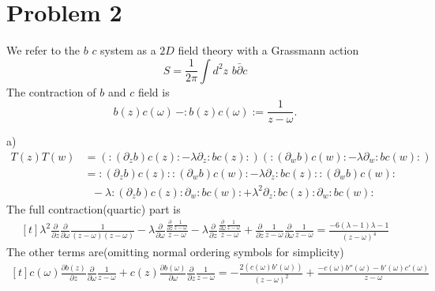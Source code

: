 \documentclass[12pt]{article}
\begin{document}
\section{Problem 2}
We refer to the $b$ $c$ system as a $2D$ field theory with a Grassmann action
\begin{equation}
S=\frac{1}{2\pi } \int d^2 z \,\,b  \bar{\partial} c
\end{equation}
The contraction of $b$ and $c$ field is 
\begin{equation}
b(z)c(\omega)\,-:b(z)c(\omega):=\frac{1}{z-\omega}.
\end{equation}
\begin{paragraph}{a)}
\begin{equation}
\begin{split}
T(z) T(w) & =\left(  : (\partial_z b) c(z): - \lambda \partial_z : b c (z): \right) \left(  : (\partial_w b) c(w): - \lambda \partial_w : b c (w): \right)  \\
& =  : (\partial_z b) c(z):  : (\partial_w b) c(w):  - \lambda \partial_z : b c (z):  : (\partial_w b) c(w):  \\
&~~~- \lambda  : (\partial_z b) c(z):\partial_w : b c (w):  + \lambda^2 \partial_z : b c (z):\partial_w : b c (w): 
\end{split}
\end{equation}
The full contraction(quartic) part is
\begin{equation}
\begin{aligned}[t]
\lambda ^2 \frac{\partial }{\partial z}\frac{\partial }{\partial \omega }\frac{1}{(z-\omega ) (z-\omega )}-\lambda  \frac{\partial }{\partial \omega }\frac{\frac{\partial }{\partial z}\frac{1}{z-\omega }}{z-\omega }-\lambda  \frac{\partial }{\partial z}\frac{\frac{\partial }{\partial \omega }\frac{1}{z-\omega }}{z-\omega }+\frac{\partial }{\partial z}\frac{1}{z-\omega } \frac{\partial }{\partial \omega }\frac{1}{z-\omega }=\frac{-6 (\lambda -1) \lambda -1}{(z-\omega )^4}
\end{aligned}
\end{equation}
The other terms are(omitting normal ordering symbols for simplicity)
\begin{equation}
\begin{aligned}[t]
c(\omega ) \frac{\partial b(z)}{\partial z} \frac{\partial }{\partial \omega }\frac{1}{z-\omega }+c(z) \frac{\partial b(\omega )}{\partial \omega } \frac{\partial }{\partial z}\frac{1}{z-\omega }=-\frac{2 \left(c(\omega ) b'(\omega )\right)}{(z-\omega )^2}+\frac{-c(\omega ) b''(\omega )-b'(\omega ) c'(\omega )}{z-\omega }\\

\end{aligned}
\end{equation}
\end{paragraph}
\end{document}
